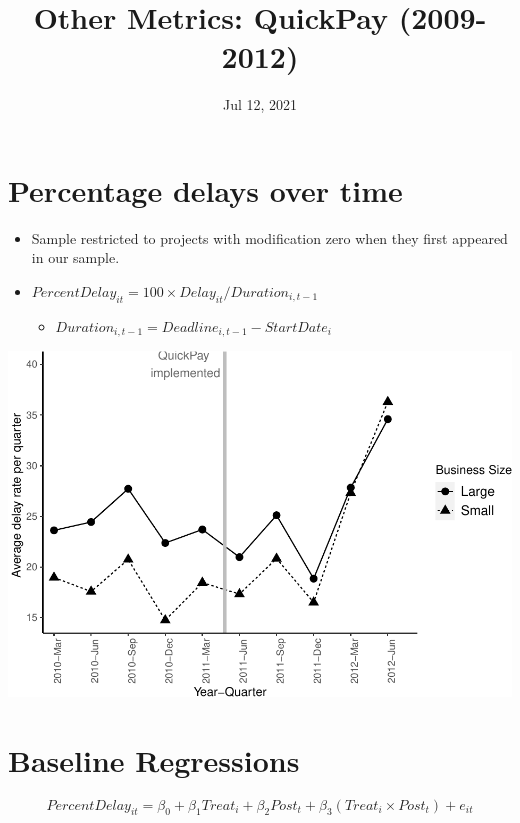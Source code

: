 \documentclass[
]{article}
\title{Other Metrics: QuickPay (2009-2012)}
\author{}
\date{\vspace{-2.5em}Jul 12, 2021}
\providecommand{\tightlist}{%
  \setlength{\itemsep}{0pt}\setlength{\parskip}{0pt}}
\begin{document}
\maketitle

\hypertarget{percentage-delays-over-time}{%
\section{Percentage delays over
time}\label{percentage-delays-over-time}}

\begin{itemize}
\tightlist
\item
  Sample restricted to projects with modification zero when they first
  appeared in our sample.
\item
  \(PercentDelay_{it}=100 \times Delay_{it}/Duration_{i,t-1}\)

  \begin{itemize}
  \tightlist
  \item
    \(Duration_{i,t-1} = Deadline_{i,t-1} - StartDate_i\)
  \end{itemize}
\end{itemize}

\includegraphics{qp_first_pc_delay_files/figure-latex/plot_relative_delay-1.pdf}

\hypertarget{baseline-regressions}{%
\section{Baseline Regressions}\label{baseline-regressions}}

\[ PercentDelay_{it} = \beta_0 + \beta_1 Treat_i + \beta_2 Post_t + \beta_3 (Treat_i \times Post_t) + e_{it}\]
\end{document}
